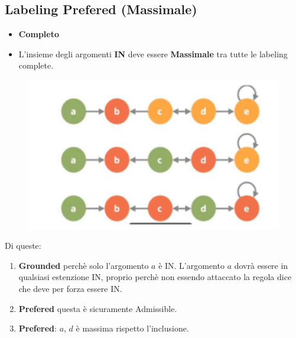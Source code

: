 \subsection{Labeling Prefered (Massimale)}
\begin{itemize}
    \item \textbf{Completo}
    \item L’insieme degli argomenti \textbf{IN} deve essere \textbf{Massimale} tra tutte le labeling complete.
\end{itemize}
\begin{figure}[htp]
	\centering
    \includegraphics[width=12cm, keepaspectratio]{img/Cap7/GR.png}
\end{figure}
Di queste:
\begin{enumerate}
    \item \textbf{Grounded} perchè solo l’argomento $a$ è IN. L’argomento $a$ dovrà essere in qualsiasi estenzione IN, proprio perchè non essendo attaccato la regola dice che deve per forza essere IN.
    \item \textbf{Prefered} questa è sicuramente Admissible.
    \item \textbf{Prefered}: $a$, $d$ è massima rispetto l’inclusione.
\end{enumerate}

